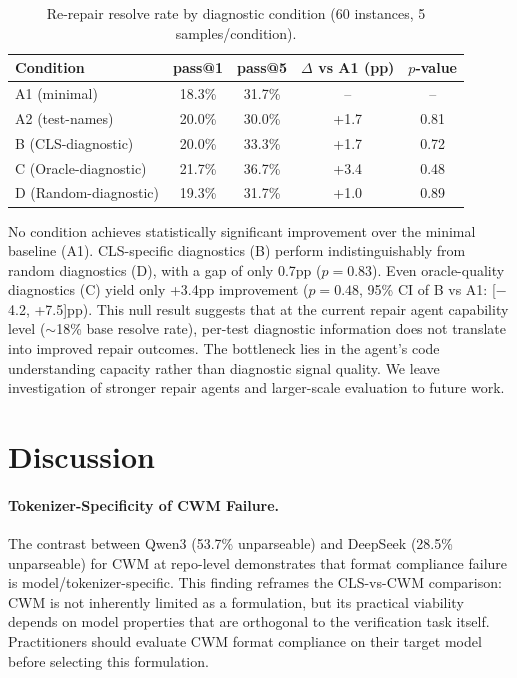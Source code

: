 \documentclass[11pt]{article}
\begin{document}
\begin{table}[h]
\centering
\caption{Re-repair resolve rate by diagnostic condition (60 instances, 5 samples/condition).}
\label{tab:rerepair}
\begin{tabular}{lcccc}
\toprule
Condition & pass@1 & pass@5 & $\Delta$ vs A1 (pp) & $p$-value \\
\midrule
A1 (minimal) & 18.3\% & 31.7\% & -- & -- \\
A2 (test-names) & 20.0\% & 30.0\% & +1.7 & 0.81 \\
B (CLS-diagnostic) & 20.0\% & 33.3\% & +1.7 & 0.72 \\
C (Oracle-diagnostic) & 21.7\% & 36.7\% & +3.4 & 0.48 \\
D (Random-diagnostic) & 19.3\% & 31.7\% & +1.0 & 0.89 \\
\bottomrule
\end{tabular}
\end{table}

No condition achieves statistically significant improvement over the minimal baseline (A1). CLS-specific diagnostics (B) perform indistinguishably from random diagnostics (D), with a gap of only 0.7pp ($p = 0.83$). Even oracle-quality diagnostics (C) yield only +3.4pp improvement ($p = 0.48$, 95\% CI of B vs A1: [$-$4.2, +7.5]pp). This null result suggests that at the current repair agent capability level ($\sim$18\% base resolve rate), per-test diagnostic information does not translate into improved repair outcomes. The bottleneck lies in the agent's code understanding capacity rather than diagnostic signal quality. We leave investigation of stronger repair agents and larger-scale evaluation to future work.

\section{Discussion}

\paragraph{Tokenizer-Specificity of CWM Failure.}
The contrast between Qwen3 (53.7\% unparseable) and DeepSeek (28.5\% unparseable) for CWM at repo-level demonstrates that format compliance failure is model/tokenizer-specific. This finding reframes the CLS-vs-CWM comparison: CWM is not inherently limited as a formulation, but its practical viability depends on model properties that are orthogonal to the verification task itself. Practitioners should evaluate CWM format compliance on their target model before selecting this formulation.
\end{document}
